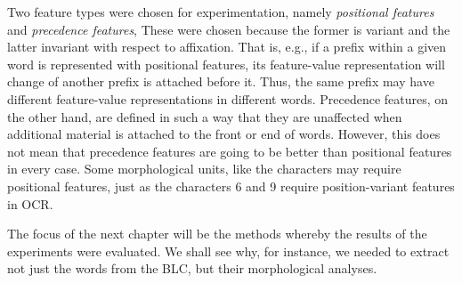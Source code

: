 Two feature types were chosen for experimentation, namely \emph{positional features} and \emph{precedence features},
These were chosen because the former is variant and the latter invariant with respect to affixation. That is, e.g., if a prefix within a given word is represented with positional features, its feature-value representation will change of another prefix is attached before it. Thus, the same prefix may have different feature-value representations in different words. Precedence features, on the other hand, are defined in such a way that they are unaffected when additional material is attached to the front or end of words. However, this does not mean that precedence features are going to be better than positional features in every case. Some morphological units, like the characters may require positional features, just as the characters 6 and 9 require position-variant features in \ac{OCR}. 

The focus of the next chapter will be the methods whereby the results of the experiments were evaluated. We shall see why, for instance, we needed to extract not just the words from the \ac{BLC}, but their morphological analyses. 

